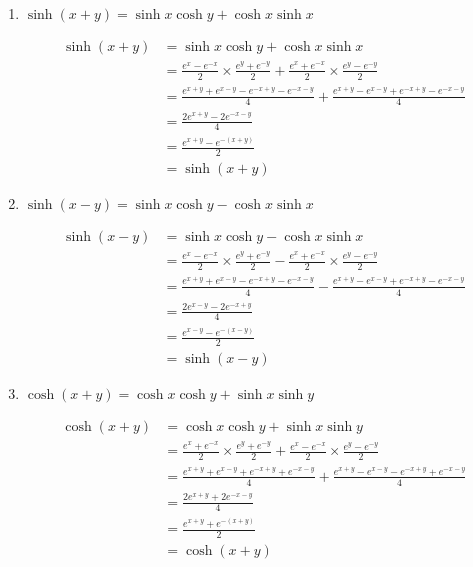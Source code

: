 \documentclass[12pt]{article}
\begin{document}
\begin{enumerate}
\item $\displaystyle\sinh(x+y)=\sinh{x}\cosh{y}+\cosh{x}\sinh{x}$

\begin{equation*}
  \begin{aligned}
  \sinh(x+y)&=\sinh{x}\cosh{y}+\cosh{x}\sinh{x}\\
  &=\frac{e^x-e^{-x}}{2}\times\frac{e^y+e^{-y}}{2}+\frac{e^x+e^{-x}}{2}\times\frac{e^y-e^{-y}}{2}\\
  &=\frac{e^{x+y}+e^{x-y}-e^{-x+y}-e^{-x-y}}{4}+\frac{e^{x+y}-e^{x-y}+e^{-x+y}-e^{-x-y}}{4}\\
  &=\frac{2e^{x+y}-2e^{-x-y}}{4}\\
  &=\frac{e^{x+y}-e^{-(x+y)}}{2}\\
  &=\sinh(x+y)
  \end{aligned}
\end{equation*}

\item $\displaystyle\sinh(x-y)=\sinh{x}\cosh{y}-\cosh{x}\sinh{x}$

\begin{equation*}
  \begin{aligned}
  \sinh(x-y)&=\sinh{x}\cosh{y}-\cosh{x}\sinh{x}\\
  &=\frac{e^x-e^{-x}}{2}\times\frac{e^y+e^{-y}}{2}-\frac{e^x+e^{-x}}{2}\times\frac{e^y-e^{-y}}{2}\\
  &=\frac{e^{x+y}+e^{x-y}-e^{-x+y}-e^{-x-y}}{4}-\frac{e^{x+y}-e^{x-y}+e^{-x+y}-e^{-x-y}}{4}\\
  &=\frac{2e^{x-y}-2e^{-x+y}}{4}\\
  &=\frac{e^{x-y}-e^{-(x-y)}}{2}\\
  &=\sinh(x-y)
  \end{aligned}
\end{equation*}

\item $\displaystyle\cosh(x+y)=\cosh{x}\cosh{y}+\sinh{x}\sinh{y}$

\begin{equation*}
  \begin{aligned}
  \cosh(x+y)&=\cosh{x}\cosh{y}+\sinh{x}\sinh{y}\\
  &=\frac{e^x+e^{-x}}{2}\times\frac{e^y+e^{-y}}{2}+\frac{e^x-e^{-x}}{2}\times\frac{e^y-e^{-y}}{2}\\
  &=\frac{e^{x+y}+e^{x-y}+e^{-x+y}+e^{-x-y}}{4}+\frac{e^{x+y}-e^{x-y}-e^{-x+y}+e^{-x-y}}{4}\\
  &=\frac{2e^{x+y}+2e^{-x-y}}{4}\\
  &=\frac{e^{x+y}+e^{-(x+y)}}{2}\\
  &=\cosh(x+y)
  \end{aligned}
\end{equation*}


\end{enumerate}
\end{document}

